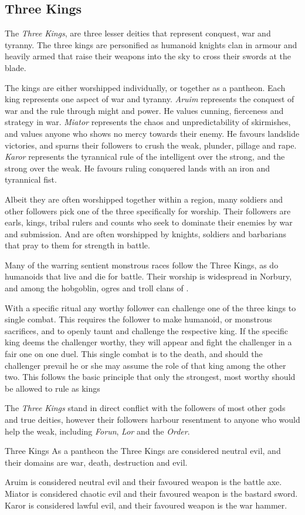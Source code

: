 \subsection{Three Kings}
\label{sec:Three Kings}

The \emph{Three Kings}, are three lesser deities that represent conquest, war
and tyranny. The three kings are personified as humanoid knights clan in
armour and heavily armed that raise their weapons into the sky to cross their
swords at the blade.

The kings are either worshipped individually, or together as a pantheon. Each
king represents one aspect of war and tyranny. \emph{Aruim} represents the
conquest of war and the rule through might and power. He values cunning,
fierceness and strategy in war. \emph{Miator} represents the chaos and
unpredictability of skirmishes, and values anyone who shows no mercy towards
their enemy. He favours landslide victories, and spurns their followers to crush
the weak, plunder, pillage and rape. \emph{Karor} represents the tyrannical
rule of the intelligent over the strong, and the strong over the weak. He
favours ruling conquered lands with an iron and tyrannical fist.

Albeit they are often worshipped together within a region, many soldiers and
other followers pick one of the three specifically for worship. Their
followers are earls, kings, tribal rulers and counts who seek to dominate
their enemies by war and submission. And are often worshipped by knights,
soldiers and barbarians that pray to them for strength in battle.

Many of the warring sentient monstrous races follow the Three Kings, as do
humanoids that live and die for battle. Their worship is widespread in
Norbury, and among the hobgoblin, ogres and troll clans of
.

With a specific ritual any worthy follower can challenge one of the three
kings to single combat. This requires the follower to make humanoid, or
monstrous sacrifices, and to openly taunt and challenge the respective
king. If the specific king deems the challenger worthy, they will appear and
fight the challenger in a fair one on one duel. This single combat is to the
death, and should the challenger prevail he or she may assume the role of that
king among the other two. This follows the basic principle that only the
strongest, most worthy should be allowed to rule as kings

The \emph{Three Kings} stand in direct conflict with the followers of most
other gods and true deities, however their followers harbour resentment to
anyone who would help the weak, including \emph{Forun}, \emph{Lor} and the
\emph{Order}.

\begin{35e}{Three Kings}
  As a pantheon the Three Kings are considered neutral evil, and their domains
  are war, death, destruction and evil.

  Aruim is considered neutral evil and their favoured weapon is the battle axe.
  Miator is considered chaotic evil and their favoured weapon is the bastard
  sword. Karor is considered lawful evil, and their favoured weapon is the
  war hammer.
\end{35e}
